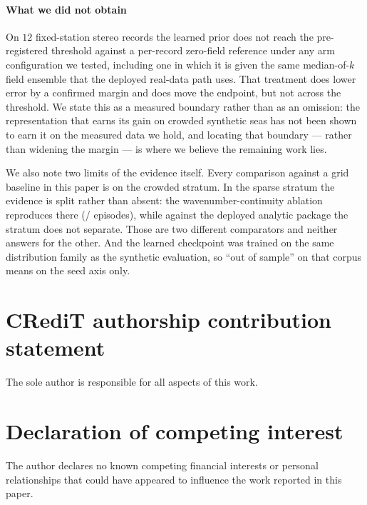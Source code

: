 \documentclass[review]{elsarticle}
\begin{document}
\paragraph{What we did not obtain}
On $12$ fixed-station stereo records the learned prior does not reach the
pre-registered threshold against a per-record zero-field reference under any arm
configuration we tested, including one in which it is given the same median-of-$k$
field ensemble that the deployed real-data path uses. That treatment does lower
error by a confirmed margin and does move the endpoint, but not across the
threshold. We state this as a measured boundary rather than as an omission: the
representation that earns its gain on crowded synthetic seas has not been shown to
earn it on the measured data we hold, and locating that boundary --- rather than
widening the margin --- is where we believe the remaining work lies.

We also note two limits of the evidence itself. Every comparison against a grid
baseline in this paper is on the crowded stratum. In the sparse stratum the evidence
is split rather than absent: the wavenumber-continuity ablation reproduces there
(\BNineteenBetter{}/\BNineteenN{} episodes), while against the deployed analytic
package the stratum does not separate. Those are two different comparators and
neither answers for the other.
And the learned checkpoint was trained on the same distribution family
as the synthetic evaluation, so ``out of sample'' on that corpus means on the seed
axis only.


\section*{CRediT authorship contribution statement}

The sole author is responsible for all aspects of this work.

\section*{Declaration of competing interest}

The author declares no known competing financial interests or
personal relationships that could have appeared to influence
the work reported in this paper.
\end{document}
